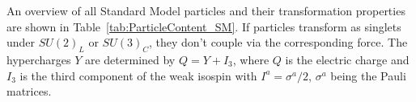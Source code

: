 An overview of all Standard Model particles and their transformation properties are shown in Table~\ref{tab:ParticleContent_SM}.
If particles transform as singlets under $SU(2)_L$ or $SU(3)_C$, they don't couple via the corresponding force.
The hypercharges $Y$ are determined by $Q=Y+I_3$, where $Q$ is the electric charge and $I_3$ is the third component of the weak isospin with $I^a = \sigma^a/2$, $\sigma^a$ being the Pauli matrices. 

\renewcommand{\arraystretch}{1.4}
\begin{table}[!h]
\centering
\caption{All particles contained in the Standard Model and their transformation properties under $SU(3)_C  \times SU(2)_L \times U(1)_Y$. 
         For the gauge groups $SU(3)_C$ and $SU(2)_L$, the representations are listed whereas for $U(1)_Y$ the hypercharge is given.}
\label{tab:ParticleContent_SM}
\end{table}  


